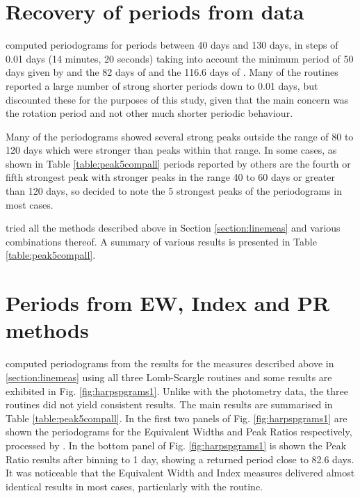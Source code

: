 \section{Recovery of periods from {\harps} data}
\protect\label{section:harps}

{\FirstP} computed periodograms for periods between 40 days and 130 days, in steps of 0.01 days (14 minutes, 20 seconds)
taking into account the minimum period of 50 days given by \citet{kurster99} and the 82 days of
\citealt{benedict92,benedict93,benedict98,kiraga07} and the 116.6 days of \citet[Table 3]{suarezmascareno15}. Many of
the routines reported a large number of strong shorter periods down to 0.01 days, but {\Firstp} discounted these for the
purposes of this study, given that the main concern was the rotation period and not other much shorter periodic
behaviour.

Many of the periodograms showed several strong peaks outside the range of 80 to 120 days which were stronger than peaks
within that range. In some cases, as shown in Table \ref{table:peak5compall} periods reported by others are the
fourth or fifth strongest peak with stronger peaks in the range 40 to 60 days or greater than 120 days, so {\Firstp}
decided to note the 5 strongest peaks of the periodograms in most cases.

{\FirstP} tried all the methods described above in Section \ref{section:linemeas} and various combinations thereof. A
summary of various results is presented in Table \ref{table:peak5compall}.

\section{Periods from EW, {\ha} Index and PR methods}
\protect\label{section:harpsper}

{\FirstP} computed periodograms from the results for the measures described above in \ref{section:linemeas} using all
three Lomb-Scargle routines and some results are exhibited in Fig. \ref{fig:harpspgrams1}. Unlike with the {\asas}
photometry data, the three routines did not yield consistent results. The main results are summarised in Table
\ref{table:peak5compall}. In the first two panels of Fig. \ref{fig:harpspgrams1} are shown the periodograms for the
Equivalent Widths and Peak Ratios respectively, processed by {\gatspy}. In the bottom panel of
Fig. \ref{fig:harpspgrams1} is shown the Peak Ratio results after binning to 1 day, showing a returned period close to
82.6 days. It was noticeable that the Equivalent Width and {\ha} Index measures delivered almost identical results in
most cases, particularly with the {\gatspy} routine.

